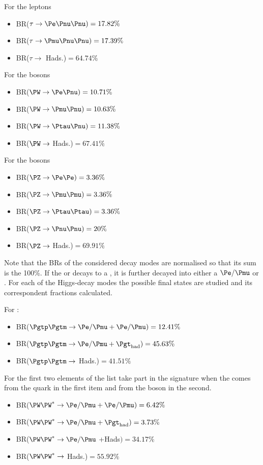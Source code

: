 \begin{multicols}{2}
For the \Ptau leptons 
\begin{itemize}
	\item  BR($\tau \rightarrow \Pe \Pnu \Pnu)= 17.82\%$
	\item  BR($\tau \rightarrow \Pmu \Pnu \Pnu)= 17.39\%$
	\item  BR($\tau \rightarrow$ Hads.)$= 64.74\%$
\end{itemize}
\columnbreak
For the \PW bosons
\begin{itemize}
	\item  BR($\PW \rightarrow \Pe \Pnu) = 10.71\%$
	\item  BR($\PW \rightarrow \Pmu \Pnu) = 10.63\%$
	\item  BR($\PW \rightarrow \Ptau \Pnu) =11.38\%$
	\item  BR($\PW \rightarrow$ Hads.)$= 67.41\%$
\end{itemize}
\end{multicols}
For the \PZ bosons
\begin{itemize}
	\item  BR($\PZ \rightarrow \Pe \Pe)= 3.36\%$
	\item  BR($\PZ \rightarrow \Pmu \Pmu)= 3.36\%$
	\item  BR($\PZ \rightarrow \Ptau \Ptau)= 3.36\%$
	\item  BR($\PZ \rightarrow \Pnu \Pnu)= 20\%$
	\item  BR($\PZ \rightarrow$ Hads.)$= 69.91\%$
\end{itemize}

Note that the BRs of the considered decay modes are normalised
so that its sum is the 100\%. 
If the \PW or \PZ decays to a \Ptau, it is further decayed into either
a $\emu$ or \tauhad. 
For each of the Higgs-decay modes the possible final states are studied
and its correspondent fractions calculated. 

For \Htautau:
\begin{itemize}
	\item  BR($\tautau \rightarrow \emu + \emu)= 12.41\%$
	\item  BR($\tautau \rightarrow \emu + \tauhad)= 45.63\%$
	\item  BR($\tautau \rightarrow$ Hads.)$= 41.51\%$
\end{itemize}

For \HWW the first two elements of the list take part 
in the \dileptau signature when the \tauhad comes from 
the \Ptop quark in the first item and from the \PHiggs boson
in the second. 
\begin{itemize}
	\item  BR($\WW \rightarrow \emu +\emu)= 6.42\%$ 
	\item  BR($\WW \rightarrow \emu +\tauhad)= 3.73\%$
	\item  BR($\WW \rightarrow \emu$ +Hads$)= 34.17\%$
	\item  BR($\WW \rightarrow$ Hads.)$= 55.92\%$
\end{itemize}

